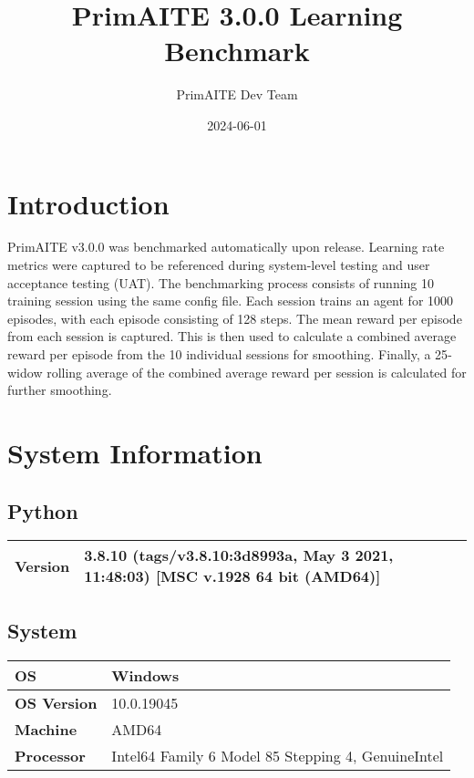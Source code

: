 \documentclass{article}%
\title{PrimAITE 3.0.0 Learning Benchmark}%
\author{PrimAITE Dev Team}%
\date{2024{-}06{-}01}%
\begin{document}
%
\normalsize%
\maketitle%
\section{Introduction}%
\label{sec:Introduction}%
PrimAITE v3.0.0 was benchmarked automatically upon release. Learning rate metrics were captured to be referenced during system{-}level testing and user acceptance testing (UAT).%
\newline%
The benchmarking process consists of running 10 training session using the same config file. Each session trains an agent for 1000 episodes, with each episode consisting of 128 steps.%
\newline%
The mean reward per episode from each session is captured. This is then used to calculate a combined average reward per episode from the 10 individual sessions for smoothing. Finally, a 25{-}widow rolling average of the combined average reward per session is calculated for further smoothing.

%
\section{System Information}%
\label{sec:SystemInformation}%
\subsection{Python}%
\label{subsec:Python}%
\begin{tabular}{|l|l|}%
\hline%
\textbf{Version}&3.8.10 (tags/v3.8.10:3d8993a, May  3 2021, 11:48:03) {[}MSC v.1928 64 bit (AMD64){]}\\%
\hline%
\end{tabular}

%
\subsection{System}%
\label{subsec:System}%
\begin{tabular}{|l|l|}%
\hline%
\textbf{OS}&Windows\\%
\hline%
\textbf{OS Version}&10.0.19045\\%
\hline%
\textbf{Machine}&AMD64\\%
\hline%
\textbf{Processor}&Intel64 Family 6 Model 85 Stepping 4, GenuineIntel\\%
\hline%
\end{tabular}
\end{document}
